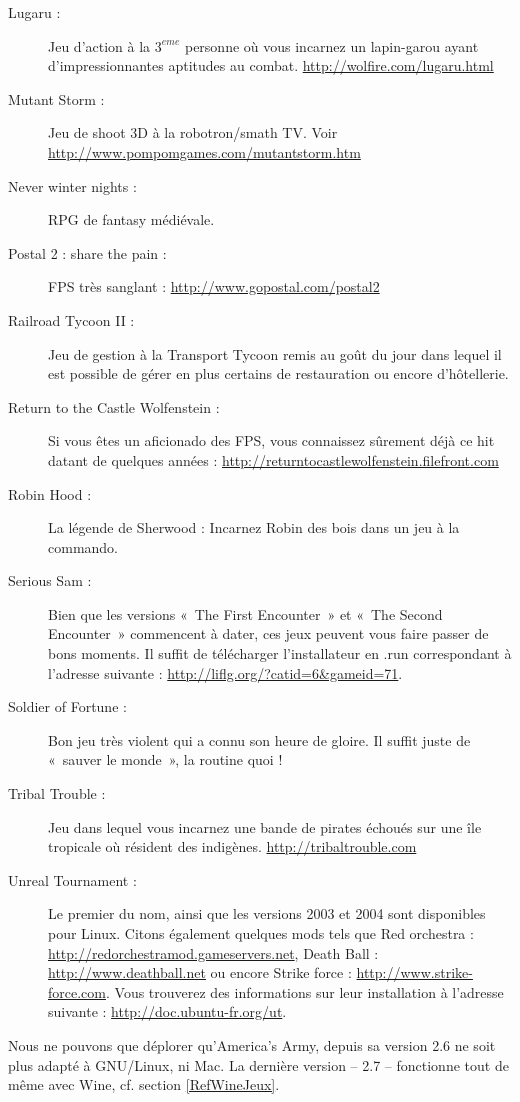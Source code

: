 \begin{description}
\item[Lugaru :] Jeu d'action à la $3^{eme}$ personne où vous incarnez un lapin-garou ayant d'impressionnantes aptitudes au combat. \url{http://wolfire.com/lugaru.html}
\item[Mutant Storm :] Jeu de shoot 3D à la robotron/smath TV. Voir \url{http://www.pompomgames.com/mutantstorm.htm}
\item[Never winter nights :] RPG de fantasy médiévale.
\item[Postal 2 : share the pain :] FPS très sanglant : \url{http://www.gopostal.com/postal2}
\item[Railroad Tycoon II :] Jeu de gestion à la Transport Tycoon remis au goût du jour dans lequel il est possible de gérer en plus certains  de restauration ou encore d'hôtellerie.
\item[Return to the Castle Wolfenstein :] Si vous êtes un aficionado des FPS, vous connaissez sûrement déjà ce hit datant de quelques années : \url{http://returntocastlewolfenstein.filefront.com}
\item[Robin Hood :] La légende de Sherwood : Incarnez Robin des bois dans un jeu à la commando.
\item[Serious Sam :] Bien que les versions «~The First Encounter~» et «~The Second Encounter~» commencent à dater, ces jeux peuvent vous faire passer de bons moments. Il suffit de télécharger l'installateur en .run correspondant à l'adresse suivante : \url{http://liflg.org/?catid=6&gameid=71}.
\item[Soldier of Fortune :] Bon jeu très violent qui a connu son heure de gloire. Il suffit juste de «~sauver le monde~», la routine quoi ! 
\item[Tribal Trouble :] Jeu dans lequel vous incarnez une bande de pirates échoués sur une île tropicale où résident des indigènes. \url{http://tribaltrouble.com}
\item[Unreal Tournament :] Le premier du nom, ainsi que les versions 2003 et 2004 sont disponibles pour Linux. Citons également quelques mods tels que Red orchestra : \url{http://redorchestramod.gameservers.net}, Death Ball : \url{http://www.deathball.net} ou encore Strike force : \url{http://www.strike-force.com}. Vous trouverez des informations sur leur installation à l'adresse suivante : \url{http://doc.ubuntu-fr.org/ut}.
\end{description}
\begin{nota}
Nous ne pouvons que déplorer qu'America's Army, depuis sa version 2.6 ne soit plus adapté à GNU/Linux, ni Mac. La dernière version -- 2.7 -- fonctionne tout de même avec Wine, cf. section \ref{RefWineJeux}.
\end{nota}
